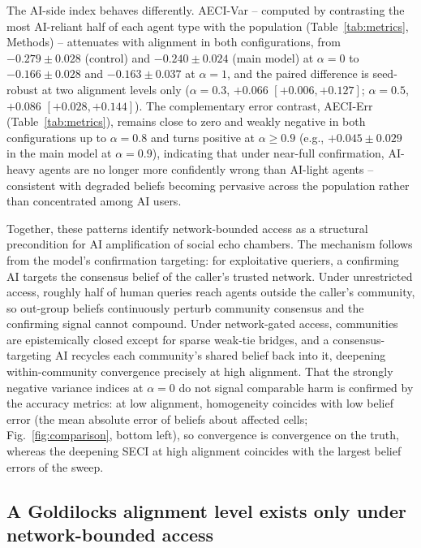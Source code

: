 \documentclass[pdflatex,sn-nature]{sn-jnl}
\begin{document}
The AI-side index behaves differently. AECI-Var -- computed by contrasting the most AI-reliant half of each agent type with the population (Table~\ref{tab:metrics}, Methods) -- attenuates with alignment in both configurations, from $-0.279 \pm 0.028$ (control) and $-0.240 \pm 0.024$ (main model) at $\alpha = 0$ to $-0.166 \pm 0.028$ and $-0.163 \pm 0.037$ at $\alpha = 1$, and the paired difference is seed-robust at two alignment levels only ($\alpha = 0.3$, $+0.066$ $[+0.006, +0.127]$; $\alpha = 0.5$, $+0.086$ $[+0.028, +0.144]$). The complementary error contrast, AECI-Err (Table~\ref{tab:metrics}), remains close to zero and weakly negative in both configurations up to $\alpha = 0.8$ and turns positive at $\alpha \geq 0.9$ (e.g., $+0.045 \pm 0.029$ in the main model at $\alpha = 0.9$), indicating that under near-full confirmation, AI-heavy agents are no longer more confidently wrong than AI-light agents -- consistent with degraded beliefs becoming pervasive across the population rather than concentrated among AI users.

Together, these patterns identify network-bounded access as a structural precondition for AI amplification of social echo chambers. The mechanism follows from the model's confirmation targeting: for exploitative queriers, a confirming AI targets the consensus belief of the caller's trusted network. Under unrestricted access, roughly half of human queries reach agents outside the caller's community, so out-group beliefs continuously perturb community consensus and the confirming signal cannot compound. Under network-gated access, communities are epistemically closed except for sparse weak-tie bridges, and a consensus-targeting AI recycles each community's shared belief back into it, deepening within-community convergence precisely at high alignment. That the strongly negative variance indices at $\alpha = 0$ do not signal comparable harm is confirmed by the accuracy metrics: at low alignment, homogeneity coincides with low belief error (the mean absolute error of beliefs about affected cells; Fig.~\ref{fig:comparison}, bottom left), so convergence is convergence on the truth, whereas the deepening SECI at high alignment coincides with the largest belief errors of the sweep.

\subsection{A Goldilocks alignment level exists only under network-bounded access}\label{sec:claim2}
\end{document}
